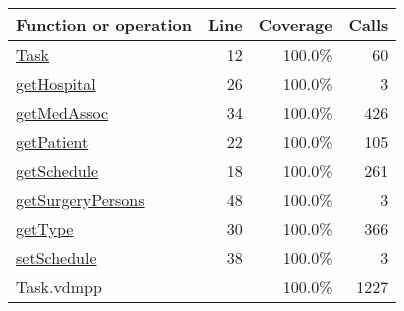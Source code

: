 \begin{longtable}{|l|r|r|r|}
\hline
Function or operation & Line & Coverage & Calls \\
\hline
\hline
\hyperref[Task:12]{Task} & 12&100.0\% & 60 \\
\hline
\hyperref[getHospital:26]{getHospital} & 26&100.0\% & 3 \\
\hline
\hyperref[getMedAssoc:34]{getMedAssoc} & 34&100.0\% & 426 \\
\hline
\hyperref[getPatient:22]{getPatient} & 22&100.0\% & 105 \\
\hline
\hyperref[getSchedule:18]{getSchedule} & 18&100.0\% & 261 \\
\hline
\hyperref[getSurgeryPersons:48]{getSurgeryPersons} & 48&100.0\% & 3 \\
\hline
\hyperref[getType:30]{getType} & 30&100.0\% & 366 \\
\hline
\hyperref[setSchedule:38]{setSchedule} & 38&100.0\% & 3 \\
\hline
\hline
Task.vdmpp & & 100.0\% & 1227 \\
\hline
\end{longtable}

